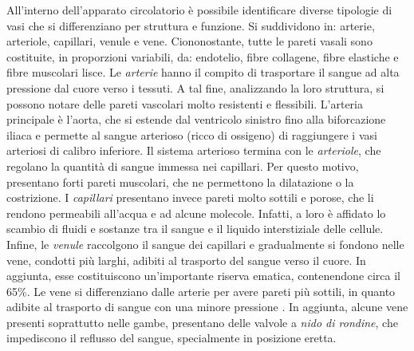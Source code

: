 All'interno dell'apparato circolatorio è possibile identificare diverse tipologie di vasi che si differenziano per struttura e funzione. Si suddividono in: arterie, arteriole, capillari, venule e vene. Ciononostante, tutte le pareti vasali sono costituite, in proporzioni variabili, da: endotelio, fibre collagene, fibre elastiche e fibre muscolari lisce. 
Le \textit{arterie} hanno il compito di trasportare il sangue ad alta pressione dal cuore verso i tessuti. A tal fine, analizzando la loro struttura, si possono notare delle pareti vascolari molto resistenti e flessibili. L'arteria principale è l'aorta, che si estende dal ventricolo sinistro  fino alla biforcazione iliaca e permette al sangue arterioso (ricco di ossigeno) di raggiungere i vasi arteriosi di calibro inferiore.
Il sistema arterioso termina con le \textit{arteriole}, che regolano la quantità di sangue immessa nei capillari. Per questo motivo, presentano forti pareti muscolari, che ne permettono la dilatazione o la costrizione.
I \textit{capillari} presentano invece pareti molto sottili e porose, che li rendono permeabili all'acqua e ad alcune molecole. Infatti, a loro è affidato lo scambio di fluidi e sostanze tra il sangue e il liquido interstiziale delle cellule. 
Infine, le \textit{venule} raccolgono il sangue dei capillari e gradualmente si fondono nelle vene, condotti più larghi, adibiti al trasporto del sangue verso il cuore. In aggiunta, esse costituiscono un'importante riserva ematica, contenendone circa il 65\%. Le vene si differenziano dalle arterie per avere pareti più sottili, in quanto adibite al trasporto di sangue con una minore pressione \cite{Armentano2019}. In aggiunta, alcune vene presenti soprattutto nelle gambe, presentano delle valvole a \textit{nido di rondine}, che impediscono il reflusso del sangue, specialmente in posizione eretta. 

